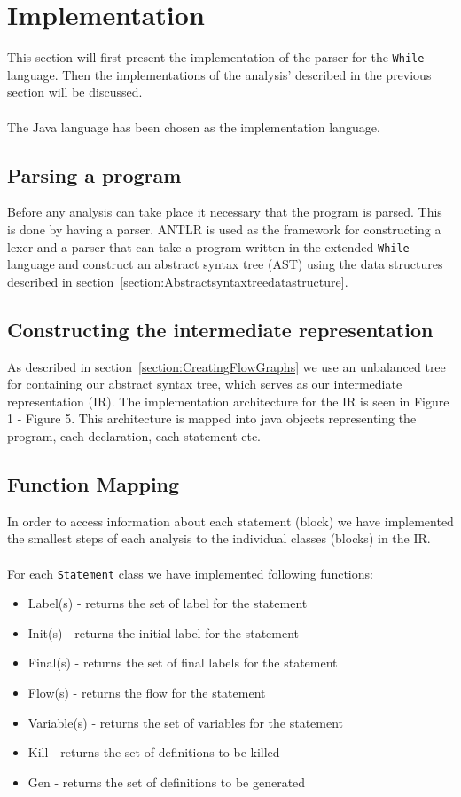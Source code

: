 \chapter{Implementation}
This section will first present the implementation of the parser for the \texttt{While} language. Then the implementations of the analysis' described in the previous section will be discussed.
\\\\
The Java language has been chosen as the implementation language.
 
\section{Parsing a program}
Before any analysis can take place it necessary that the program is parsed. This is done by having a parser. ANTLR is used as the framework for constructing a lexer and a parser that can take a program written in the extended \texttt{While} language and construct an abstract syntax tree (AST) using the data structures described in section~\ref{section:Abstractsyntaxtreedatastructure}. 

\section{Constructing the intermediate representation}
As described in section~\ref{section:CreatingFlowGraphs} we use an unbalanced tree for containing our abstract syntax tree, which serves as our intermediate representation (IR).
The implementation architecture for the IR is seen in Figure 1 - Figure 5. This architecture is mapped into java objects representing the program, each declaration, each statement etc.

\section{Function Mapping}
In order to access information about each statement (block) we have implemented the smallest steps of each analysis to the individual classes (blocks) in the IR.
\\\\
For each \texttt{Statement} class we have implemented following functions:
\begin{itemize}
\item Label(s) - returns the set of label for the statement 		
\item Init(s) - returns the initial label for the statement
\item Final(s) - returns the set of final labels for the statement 
\item Flow(s) - returns the flow for the statement
\item Variable(s) - returns the set of variables for the statement
\item Kill - returns the set of definitions to be killed	
\item Gen - returns the set of definitions to be generated
\end{itemize}

